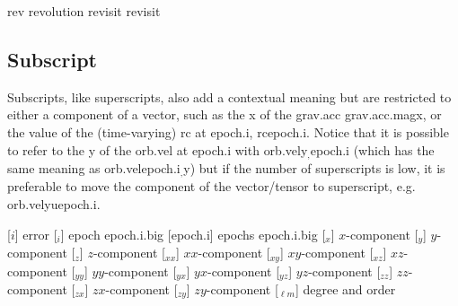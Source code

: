 \begin{acronym}[---------------]
					{rev} 					{revolution}
			{revisit}				{revisit}

\ifdefined\IncludeSymbolsText
\begin{changemargin}{\symbolsleftmarginfix}{\symbolsrightmarginfix}
\ifdefined\IncludeSymbolsSections
\section{Subscript}
\label{sec:acro_sub}
\else
{}\medskip
\fi

Subscripts, like superscripts, also add a contextual meaning but are restricted to either a component of a vector, such as the \acl{x} of the \acl{grav.acc} \acs{grav.acc.mag}\acs{x}, or the value of the (time-varying) \acl{rc} at \acl{epoch.i}, \acs{rc}\acs{epoch.i}. Notice that it is possible to refer to the \acl{y} of the \acl{orb.vel} at \acl{epoch.i} with \acs{orb.vel}\acs{y}$_,$\acs{epoch.i} (which has the same meaning as \acs{orb.vel}\acs{epoch.i}$_,$\acs{y}) but if the number of superscripts is low, it is preferable to move the component of the vector\slash tensor to superscript, e.g. \acs{orb.vel}\acs{yu}\acs{epoch.i}.

\end{changemargin}
\fi

						{\acl{error}}
				{epoch \acs{epoch.i.big}}
			[\acs{epoch.i}]	{epochs \acs{epoch.i.big}}
					{$x$-component}
					{$y$-component}
					{$z$-component}
				{$xx$-component}
				{$xy$-component}
				{$xz$-component}
				{$yy$-component}
				{$yx$-component}
				{$yz$-component}
				{$zz$-component}
				{$zx$-component}
				{$zy$-component}
					[$_{\ell m}$]		{degree and order}


\end{acronym}


